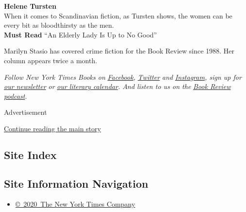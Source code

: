 \textbf{Helene Tursten}\\
When it comes to Scandinavian fiction, as Tursten shows, the women can
be every bit as bloodthirsty as the men.\\
\textbf{Must Read} ``An Elderly Lady Is Up to No Good''

Marilyn Stasio has covered crime fiction for the Book Review since 1988.
Her column appears twice a month.

\emph{Follow New York Times Books on}
\href{https://www.facebook.com/nytbooks/}{\emph{Facebook}}\emph{,}
\href{https://twitter.com/nytimesbooks}{\emph{Twitter}} \emph{and}
\href{https://www.instagram.com/nytbooks/}{\emph{Instagram}}\emph{, sign
up for}
\href{https://www.nytimes.com/newsletters/books-review}{\emph{our
newsletter}} \emph{or}
\href{https://www.nytimes.com/interactive/2017/books/books-calendar.html}{\emph{our
literary calendar}}\emph{. And listen to us on the}
\href{https://www.nytimes.com/column/book-review-podcast}{\emph{Book
Review podcast}}\emph{.}

Advertisement

\protect\hyperlink{after-bottom}{Continue reading the main story}

\hypertarget{site-index}{%
\subsection{Site Index}\label{site-index}}

\hypertarget{site-information-navigation}{%
\subsection{Site Information
Navigation}\label{site-information-navigation}}

\begin{itemize}
\tightlist
\item
  \href{https://help.nytimes.com/hc/en-us/articles/115014792127-Copyright-notice}{©~2020~The
  New York Times Company}
\end{itemize}

